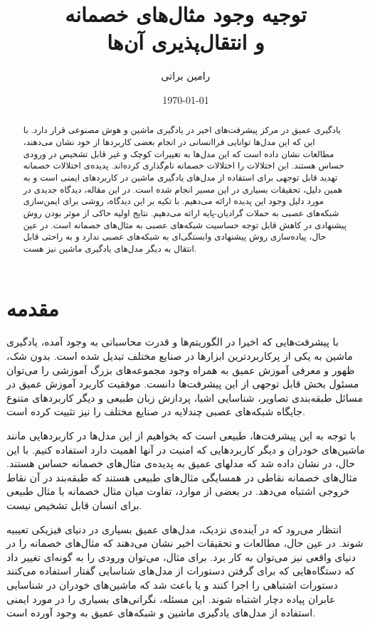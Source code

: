 \documentclass[12pt,onecolumn,a4paper]{article}
\begin{document}
\title{توجیه وجود مثال‌های خصمانه \\ و انتقال‌پذیری آن‌ها} 
\author{رامین براتی}
\date{\today}
\maketitle

\begin{abstract}
یادگیری عمیق در مرکز پیشرفت‌های اخیر در یادگیری ماشین و هوش مصنوعی قرار دارد. با این که این مدل‌ها توانایی فراانسانی در انجام بعضی کاربردها از خود نشان می‌دهند، مطالعات نشان داده است که این مدل‌ها به تغییرات کوچک و غیر قابل تشخیص در ورودی حساس هستند. این اختلالات را اختلالات خصمانه نام‌گذاری کرده‌اند. پدیده‌ی اختلالات خصمانه تهدید قابل توجهی برای استفاده از مدل‌های یادگیری ماشین در کاربردهای ایمنی است و به همین دلیل، تحقیقات بسیاری در این مسیر انجام شده است. در این مقاله، دیدگاه جدیدی در مورد دلیل وجود این پدیده ارائه می‌دهیم. با تکیه بر این دیدگاه، روشی برای ایمن‌سازی شبکه‌های عصبی به حملات گرادیان-پایه ارائه می‌دهیم. نتایج اولیه حاکی از موثر بودن روش پیشنهادی در کاهش قابل توجه حساسیت شبکه‌های عصبی به مثال‌های خصمانه است. در عین حال، پیاده‌سازی روش پیشنهادی وابستگی‌ای به شبکه‌های عصبی ندارد و به راحتی قابل انتقال به دیگر مدل‌های یادگیری ماشین نیز هست.
\end{abstract}

\section{مقدمه} 
با پیشرفت‌هایی که اخیرا در الگوریتم‌ها و قدرت محاسباتی به وجود آمده، یادگیری ماشین به یکی از پرکاربردترین ابزارها در صنایع مختلف تبدیل شده است. بدون شک، ظهور و معرفی آموزش عمیق به همراه وجود مجموعه‌های بزرگ آموزشی را می‌توان مسئول بخش قابل توجهی از این پیشرفت‌ها دانست. موفقیت‌ کاربرد آموزش عمیق در مسائل طبقه‌بندی تصاویر، شناسایی اشیا، پردازش زبان طبیعی و دیگر کاربردهای متنوع جایگاه شبکه‌های عصبی چندلایه در صنایع مختلف را نیز تثبیت کرده است.

با توجه به این پیشرفت‌ها، طبیعی است که بخواهیم از این مدل‌ها در کاربردهایی مانند ماشین‌های خودران و دیگر کاربردهایی که امنیت در آنها اهمیت دارد استفاده کنیم. با این حال، در
\cite{szegedy2013intriguing} 
نشان داده شد که مدلهای عمیق به پدیده‌ی مثال‌های خصمانه حساس هستند. مثال‌های خصمانه نقاطی در همسایگی مثال‌های طبیعی هستند که طبقه‌بند در آن نقاط خروجی اشتباه می‌دهد. در بعضی از موارد، تفاوت میان مثال خصمانه با مثال طبیعی برای انسان قابل تشخیص نیست.

انتظار می‌رود که در آینده‌ی نزدیک، مدل‌های عمیق بسیاری در دنیای فیزیکی تعیبیه شوند. در عین حال، مطالعات و تحقیقات اخیر نشان می‌دهند که مثال‌های خصمانه را در دنیای واقعی نیز می‌توان به کار برد. برای مثال، می‌توان ورودی را به گونه‌ای تغییر داد که دستگاه‌هایی که برای گرفتن دستورات از مدل‌های شناسایی گفتار استفاده می‌کنند دستورات اشتباهی را اجرا کنند و یا باعث شد که ماشین‌های خودران در شناسایی عابران پیاده دچار اشتباه شوند. این مسئله، نگرانی‌های بسیاری را در مورد ایمنی استفاده از مدل‌های یادگیری ماشین و شبکه‌های عمیق به وجود آورده است.
\end{document}
